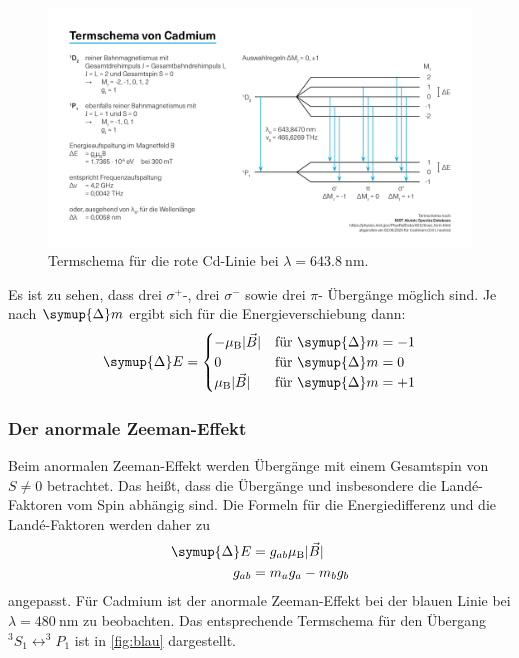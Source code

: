 \begin{figure}[H]
    \centering
    \includegraphics[width=\textwidth]{graphics/termschema_Cd_rot.png}
    \caption{Termschema für die rote Cd-Linie bei $\lambda = \SI{643.8}{\nano\meter}$. \cite{rot}}
    \label{fig:rot1}
\end{figure}

Es ist zu sehen, dass drei $\sigma^{+}$-, drei $\sigma^{-}$ sowie drei $\pi$- Übergänge möglich sind. Je nach $\symup{\Delta} m$ ergibt sich für die Energieverschiebung dann:
\begin{equation*}
    \symup{\Delta} E =
    \begin{cases}
        - \mu_\text{B} \lvert \vec{B} \rvert & \text{für } \symup{\Delta} m = -1 \\
        0 & \text{für } \symup{\Delta} m = 0 \\
        \mu_\text{B} \lvert \vec{B} \rvert & \text{für } \symup{\Delta} m = +1
    \end{cases}
\end{equation*}

\subsubsection{Der anormale Zeeman-Effekt}

Beim anormalen Zeeman-Effekt werden Übergänge mit einem Gesamtspin von $S \neq 0$ betrachtet. Das heißt, dass die Übergänge und insbesondere die Landé-Faktoren vom Spin abhängig sind. Die Formeln für die Energiedifferenz und die Landé-Faktoren werden daher zu 
\begin{align}
    \symup{\Delta} E &= g_{ab} \mu_\text{B} \lvert \vec{B} \rvert \ 
    \label{eqn:energiedifferenz}\\
    g_{ab} &= m_a g_a - m_b g_b
    \label{eqn:lande_anormal}
\end{align}
angepasst.
\newline
\noindent
Für Cadmium ist der anormale Zeeman-Effekt bei der blauen Linie bei $\lambda = \SI{480}{\nano\meter}$ zu beobachten. Das entsprechende Termschema für den Übergang $^3S_1 \leftrightarrow ^3P_1$ ist in \autoref{fig:blau} dargestellt.

